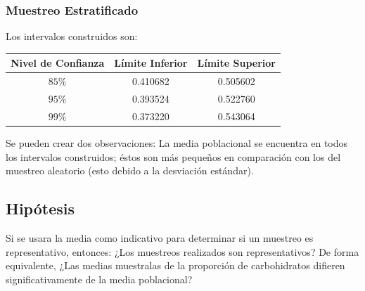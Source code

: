 \documentclass[12pt,a4paper]{article}
\begin{document}
    \subsubsection{Muestreo Estratificado}
        Los intervalos construidos son:
        \begin{center}
            \begin{tabular}{|c|c|c|}
                \hline
                Nivel de Confianza & Límite Inferior & Límite Superior \\
                \hline
                $85\%$ & 0.410682 & 0.505602 \\
                $95\%$ & 0.393524 & 0.522760 \\
                $99\%$ & 0.373220 & 0.543064 \\
                \hline
                \end{tabular}
        \end{center}
        Se pueden crear dos observaciones: La media 
        poblacional se encuentra en todos los intervalos 
        construidos; éstos son más pequeños en comparación 
        con los del muestreo aleatorio (esto debido a la 
        desviación estándar).

    \subsection{Hipótesis}
        Si se usara la media como indicativo para determinar 
        si un muestreo es representativo, entonces: ¿Los muestreos 
        realizados son representativos? De forma equivalente, ¿Las 
        medias muestralas de la proporción de carbohidratos difieren 
        significativamente de la media poblacional?
        

\newpage
\end{document}
